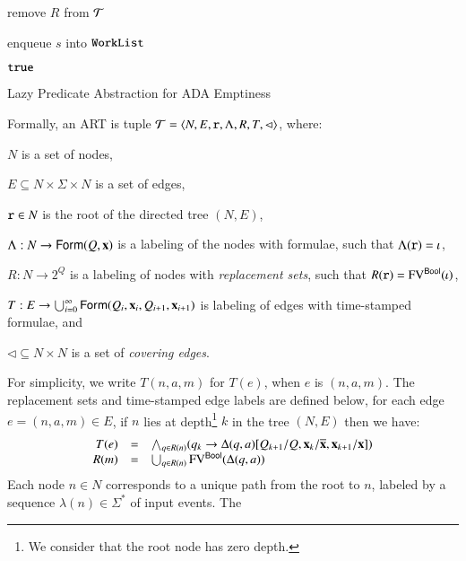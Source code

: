 \documentclass[10pt,conference,letterpaper,twocolumn]{IEEEtran}
\begin{document}
\begin{algorithm}[t!]
{\begin{algorithmic}[1]
  \EndFor

  \EndFor

  \State remove $R$ from $\mathcal{T}$

  \State enqueue $s$ into $\mathtt{WorkList}$ 
  \label{ln:expand}

  \EndIf

  \EndFor

  \EndIf

  \EndWhile

   $\mathtt{true}$
  \label{ln:true}
\end{algorithmic}}
\caption{Lazy Predicate Abstraction for ADA Emptiness}
\label{alg:predabs}
\end{algorithm}

Formally, an ART is tuple $\mathcal{T} =
\left\langle N,E,\mathtt{r},\Lambda,R,T,\lhd \right\rangle$, where: \begin{compactitem}
\item $N$ is a set of nodes, 
%
\item $E \subseteq N \times \Sigma \times
N$ is a set of edges, 
%
\item $\mathtt{r} \in N$ is the root of the directed
tree $(N,E)$, 
%
\item $\Lambda : N \rightarrow \mathsf{Form}(Q,\mathbf x)$ is a labeling of the
  nodes with formulae, such that $\Lambda(\mathtt{r}) = \iota$,
%
\item $R : N \rightarrow 2^Q$ is a labeling of nodes with
\emph{replacement sets}, such that $R(\mathtt{r}) = \mathrm{FV}^{\mathsf{Bool}}(\iota)$,
%
\item $T : E \rightarrow \bigcup_{i=0}^\infty
\mathsf{Form}(Q_i,\mathbf x_i,Q_{i+1},\mathbf x_{i+1})$ is labeling of edges with
time-stamped formulae, and 
%
\item $\lhd \subseteq N \times N$ is a set of
\emph{covering edges}. 
\end{compactitem}
For simplicity, we write $T(n,a,m)$ for $T(e)$, when $e$ is $(n,a,m)$.
The replacement sets and time-stamped edge labels are defined below,
for each edge $e = (n,a,m) \in E$, if $n$ lies at depth\footnote{We
  consider that the root node has zero depth.} $k$ in the tree
$(N,E)$ then we have:
\[\begin{array}{rcl}
T(e) & = & \bigwedge_{q \in R(n)} (q_k \rightarrow \Delta(q,a)[Q_{k+1}/Q,\mathbf x_{k}/\overline{\mathbf x},\mathbf x_{k+1}/\mathbf x]) \\
R(m) & = & \bigcup_{q \in R(n)}\mathrm{FV}^{\mathsf{Bool}}(\Delta(q,a))
\end{array}\]
Each node $n \in N$ corresponds to a unique path from the root to $n$,
labeled by a sequence $\lambda(n) \in \Sigma^*$ of input events. The
\end{document}
